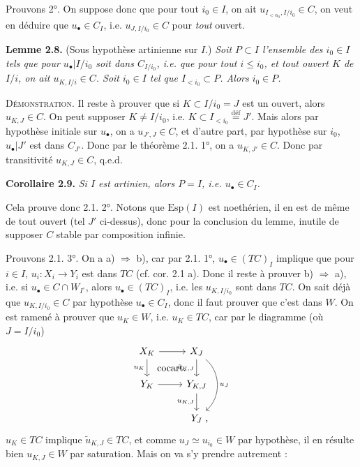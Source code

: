 \documentclass[11pt]{article}
\newcommand{\printedpage}[1]{\marginpar{\footnotesize p.~#1\ifstrequal{#1}{1}{\\[2pt]{[page 1]}}{}}}
\newcommand{\msp}[1]{\ifstrequal{#1}{page 1}{}{\marginpar{\footnotesize [#1]}}}
\begin{document}
\msp{35}

Prouvons 2°. On suppose donc que pour tout $i_0 \in I$, on ait $u_{I_{<\alpha_0},I/i_0} \in C$, on veut en déduire que $u_\bullet \in C_I$, i.e. $u_{J,I/i_0} \in C$ pour \textit{tout} ouvert.

\noindent\textbf{Lemme 2.8.} (Sous hypothèse artinienne sur $I$.) \textit{Soit $P \subset I$ l'ensemble des $i_0 \in I$ tels que pour $u_\bullet|I/i_0$ soit dans $C_{I/i_0}$, i.e. que pour tout $i \leq i_0$, et tout ouvert $K$ de $I/i$, on ait $u_{K,I/i} \in C$. Soit $i_0 \in I$ tel que $I_{<i_0} \subset P$. Alors $i_0 \in P$.}

\noindent\textsc{Démonstration}. Il reste à prouver que si $K \subset I/i_0 = J$ est un ouvert, alors $u_{K,J} \in C$. On peut supposer $K \neq I/i_0$, i.e. $K \subset I_{<i_0} \overset{\text{déf}}{=} J'$. Mais alors par hypothèse initiale sur $u_\bullet$, on a $u_{J',J} \in C$, et d'autre part, par hypothèse sur $i_0$, $u_\bullet|J'$ est dans $C_{J'}$. Donc par le théorème 2.1. 1°, on a $u_{K,J'} \in C$. Donc par transitivité $u_{K,J} \in C$, q.e.d.

\noindent\textbf{Corollaire 2.9.} \textit{Si $I$ est artinien, alors $P = I$, i.e. $u_\bullet \in C_I$.}

Cela prouve donc 2.1. 2°. Notons que $\mathrm{Esp}(I)$ est noethérien, il en est de même de tout ouvert (tel $J'$ ci-dessus), donc \msp{36} pour la conclusion du lemme, inutile de supposer $C$ stable par composition infinie.

\printedpage{20}

Prouvons 2.1. 3°. On a a) $\Longrightarrow$ b), car par 2.1. 1°, $u_\bullet \in (TC)_I$ implique que pour $i \in I$, $u_i : X_i \longrightarrow Y_i$ est dans $TC$ (cf. cor. 2.1 a). Donc il reste à prouver b) $\Longrightarrow$ a), i.e. si $u_\bullet \in C \cap W_{I^\circ}$, alors $u_\bullet \in (TC)_I$, i.e. les $u_{K,I/i_0}$ sont dans $TC$. On sait déjà que $u_{K,I/i_0} \in C$ par hypothèse $u_\bullet \in C_I$, donc il faut prouver que c'est dans $W$. On est ramené à prouver que $u_K \in W$, i.e. $u_K \in TC$, car par le diagramme (où $J = I/i_0$)
\[
\begin{tikzcd}
X_K \arrow[r] \arrow[d, "u_K"'] \arrow[dr, phantom, "\text{cocart.}"] & X_J \arrow[d, "\tilde{u}_{K,J}"'] \arrow[dd, bend left=50, "u_J"] \\
Y_K \arrow[r] & Y_{K,J} \arrow[d, "u_{K,J}"'] \\
& Y_J \rlap{\ ,}
\end{tikzcd}
\]
$u_K \in TC$ implique $\tilde{u}_{K,J} \in TC$, et comme $u_J \simeq u_{i_0} \in W$ par hypothèse, il en résulte bien $u_{K,J} \in W$ par saturation. Mais on va s'y prendre autrement :
\end{document}
